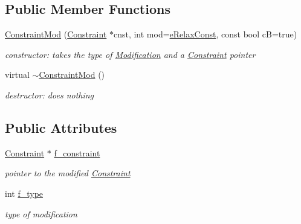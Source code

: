\subsection*{Public Member Functions}
\begin{DoxyCompactItemize}
\item 
\mbox{\hyperlink{class_s_m_spp__di__unipi__it_1_1_constraint_mod_a7a4f04b77f47c74540c0edb1dc7e24d7}{Constraint\+Mod}} (\mbox{\hyperlink{class_s_m_spp__di__unipi__it_1_1_constraint}{Constraint}} $\ast$cnst, int mod=\mbox{\hyperlink{class_s_m_spp__di__unipi__it_1_1_constraint_mod_a083683af0e6943bd7a3261e9037fd149ae7de2a648a32c2f1e3b1b789af090854}{e\+Relax\+Const}}, const bool cB=true)
\begin{DoxyCompactList}\small\item\em constructor\+: takes the type of \mbox{\hyperlink{class_s_m_spp__di__unipi__it_1_1_modification}{Modification}} and a \mbox{\hyperlink{class_s_m_spp__di__unipi__it_1_1_constraint}{Constraint}} pointer \end{DoxyCompactList}\item 
\mbox{\label{class_s_m_spp__di__unipi__it_1_1_constraint_mod_a9e626abee9ab5e51bb9ce2dc82ee9309}} 
virtual \mbox{\hyperlink{class_s_m_spp__di__unipi__it_1_1_constraint_mod_a9e626abee9ab5e51bb9ce2dc82ee9309}{$\sim$\+Constraint\+Mod}} ()
\begin{DoxyCompactList}\small\item\em destructor\+: does nothing \end{DoxyCompactList}\end{DoxyCompactItemize}
\subsection*{Public Attributes}
\begin{DoxyCompactItemize}
\item 
\mbox{\label{class_s_m_spp__di__unipi__it_1_1_constraint_mod_a714d0d3446d72b0c12cbc33835186c74}} 
\mbox{\hyperlink{class_s_m_spp__di__unipi__it_1_1_constraint}{Constraint}} $\ast$ \mbox{\hyperlink{class_s_m_spp__di__unipi__it_1_1_constraint_mod_a714d0d3446d72b0c12cbc33835186c74}{f\+\_\+constraint}}
\begin{DoxyCompactList}\small\item\em pointer to the modified \mbox{\hyperlink{class_s_m_spp__di__unipi__it_1_1_constraint}{Constraint}} \end{DoxyCompactList}\item 
\mbox{\label{class_s_m_spp__di__unipi__it_1_1_constraint_mod_a102e30a031044d9e821316a075e882b1}} 
int \mbox{\hyperlink{class_s_m_spp__di__unipi__it_1_1_constraint_mod_a102e30a031044d9e821316a075e882b1}{f\+\_\+type}}
\begin{DoxyCompactList}\small\item\em type of modification \end{DoxyCompactList}\end{DoxyCompactItemize}
